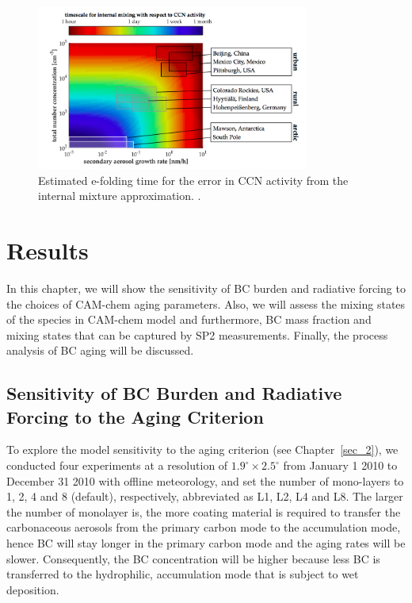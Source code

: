 \documentclass[12pt, fullpage]{uiucthesis2009_2}
\begin{document}
	\begin{figure}[h] 
		\begin{center}
			\includegraphics[width = 0.8\textwidth]{Figure07}
			\caption[Estimated e-folding time for the error in CCN activity from the internal mixture approximation. \citep{Fierce2016}]{\label{fig_P7}Estimated e-folding time for the error in CCN activity from the internal mixture approximation. \citep{Fierce2016}.}
		\end{center}
	\end{figure}
	
	\clearpage
	
	\chapter{Results}
	In this chapter, we will show the sensitivity of BC burden and radiative forcing to the choices of CAM-chem aging parameters. Also, we will assess the mixing states of the species in CAM-chem model and furthermore, BC mass fraction and mixing states that can be captured by SP2 measurements. Finally, the process analysis of BC aging will be discussed.
	
	\section{Sensitivity of BC Burden and Radiative Forcing to the Aging Criterion}{\label{sec_1}}
	To explore the model sensitivity to the aging criterion (see Chapter~\ref{sec_2}), we conducted four experiments at a resolution of $1.9^\circ \times 2.5^\circ$ from January 1 2010 to December 31 2010 with offline meteorology, and set the number of mono-layers to 1, 2, 4 and 8 (default), respectively, abbreviated as L1, L2, L4 and L8. The larger the number of monolayer is, the more coating material is required to transfer the carbonaceous aerosols from the primary carbon mode to the accumulation mode, hence BC will stay longer in the primary carbon mode and the aging rates will be slower. Consequently, the BC concentration will be higher because less BC is transferred to the hydrophilic, accumulation mode that is subject to wet deposition. 
\end{document}
